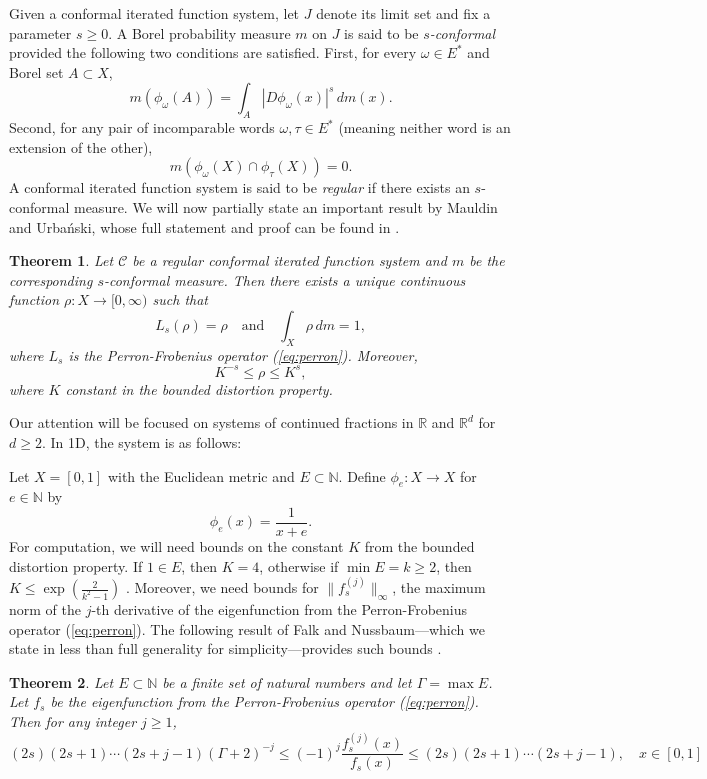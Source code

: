 \documentclass[10pt]{article}
\newtheorem{theorem}{Theorem}[section]
\theoremstyle{definition}
\numberwithin{equation}{section}
\numberwithin{figure}{section}
\numberwithin{table}{section}
\begin{document}
Given a conformal iterated function system, let $J$ denote its limit set and fix a parameter $s\geq0$. A Borel probability measure $m$ on $J$ is said to be \textit{$s$-conformal} provided the following two conditions are satisfied. First, for every $\omega\in E^*$ and Borel set $A\subset X$,
$$m(\phi_\omega(A))=\int_A|D\phi_{\omega}(x)|^s\,dm(x).$$
Second, for any pair of incomparable words $\omega,\tau\in E^*$ (meaning neither word is an extension of the other),
$$m(\phi_\omega(X)\cap\phi_\tau(X))=0.$$
A conformal iterated function system is said to be \textit{regular} if there exists an $s$-conformal measure. We will now partially state an important result by Mauldin and Urba{\'n}ski, whose full statement and proof can be found in \cite{mauldin2003graph}.
\begin{theorem}
Let $\mathcal{C}$ be a regular conformal iterated function system and $m$ be the corresponding $s$-conformal measure. Then there exists a unique continuous function $\rho:X\to[0,\infty)$ such that 
$$L_s(\rho)=\rho\quad\text{and}\quad \int_X\rho\,dm=1,$$
where $L_s$ is the Perron-Frobenius operator (\ref{eq:perron}). Moreover,
$$K^{-s}\leq\rho\leq K^s,$$
where $K$ constant in the bounded distortion property.
\label{thm:CIFS_props}
\end{theorem}

Our attention will be focused on systems of continued fractions in $\mathbb{R}$ and $\mathbb{R}^d$ for $d\geq 2$. In 1D, the system is as follows:

Let $X=[0,1]$ with the Euclidean metric and $E\subset\mathbb{N}$. Define $\phi_e:X\to X$ for $e\in \mathbb{N}$ by
$$\phi_e(x)=\frac{1}{x+e}.$$
For computation, we will need bounds on the constant $K$ from the bounded distortion property. If $1\in E$, then $K=4$, otherwise if $\min E=k\geq2$, then $K\leq\exp(\frac{2}{k^2-1})$ \cite{chousionis2020dimension}. Moreover, we need bounds for $\|f^{(j)}_s\|_\infty$, the maximum norm of the $j$-th derivative of the eigenfunction from the Perron-Frobenius operator (\ref{eq:perron}). The following result of Falk and Nussbaum—which we state in less than full generality for simplicity—provides such bounds \cite{falk2018c}. 
\begin{theorem}
Let $E\subset\mathbb{N}$ be a finite set of natural numbers and let $\Gamma=\max E$. Let $f_s$ be the eigenfunction from the Perron-Frobenius operator (\ref{eq:perron}). Then for any integer $j\geq1$,
\begin{equation}
(2s)(2s+1)\cdots(2s+j-1)(\Gamma+2)^{-j}\leq (-1)^j\frac{f_s^{(j)}(x)}{f_s(x)}\leq (2s)(2s+1)\cdots(2s+j-1),\quad x\in[0,1]
\label{eq:deriv_bounds_1D}
\end{equation}
\label{lem:deriv_bounds_1D}
\end{theorem}
\end{document}
